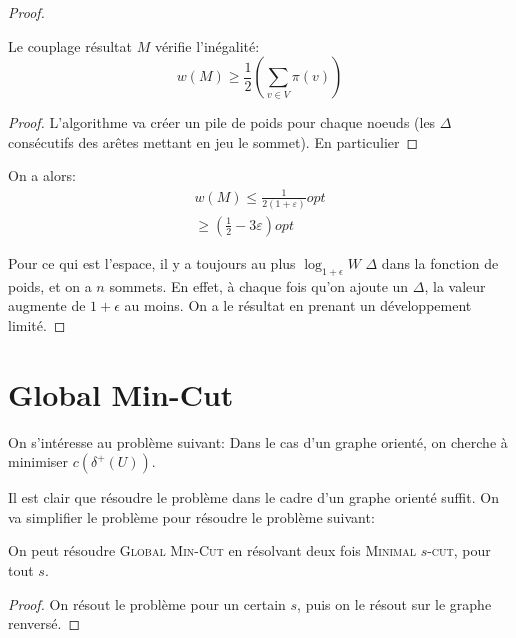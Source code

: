 \documentclass[math, info]{cours}
\begin{document}
\begin{proof}
\begin{lemme}
	Le couplage résultat $M$ vérifie l'inégalité:
	\begin{equation*}
		w(M) \geq \frac{1}{2}\left(\sum_{v\in V}\pi(v) \right)
	\end{equation*}
\end{lemme}
\begin{proof}
	L'algorithme va créer un pile de poids pour chaque noeuds (les $\Delta$ consécutifs des arêtes mettant en jeu le sommet).
	En particulier
\end{proof}

On a alors:
\begin{align*}
	w(M) \leq \frac{1}{2(1+\varepsilon)}opt\\
	\geq \left(\frac{1}{2} - 3\varepsilon \right)opt
\end{align*}

\medskip

Pour ce qui est l'espace, il y a toujours au plus $\log_{1 + \epsilon}W$ $\Delta$ dans la fonction de poids, et on a $n$ sommets.
En effet, à chaque fois qu'on ajoute un $\Delta$, la valeur augmente de $1 + \epsilon$ au moins.
On a le résultat en prenant un développement limité.
\end{proof}


\section{Global Min-Cut}
On s'intéresse au problème suivant:
Dans le cas d'un graphe orienté, on cherche à minimiser $c\left(\delta^{+}(U)\right)$.

Il est clair que résoudre le problème dans le cadre d'un graphe orienté suffit.
On va simplifier le problème pour résoudre le problème suivant:

\begin{proposition}
	On peut résoudre \textsc{Global Min-Cut} en résolvant deux fois \textsc{Minimal $s$-cut}, pour tout $s$.
	\label{prop:minscut}
\end{proposition}
\begin{proof}
	On résout le problème pour un certain $s$, puis on le résout sur le graphe renversé.
\end{proof}
\end{document}
